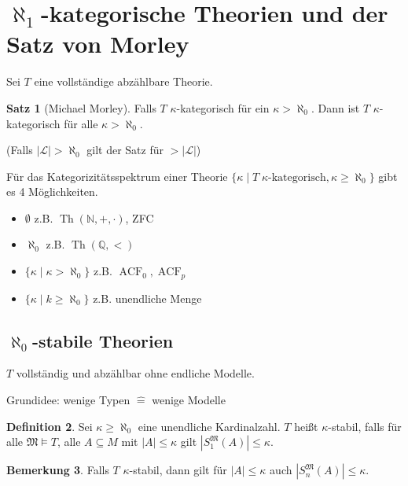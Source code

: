 \documentclass[12pt,parskip=full]{scrartcl}
\newcommand{\setN}{\mathbb{N}}
\newcommand{\setQ}{\mathbb{Q}}
\newcommand{\abs}[1]{{\left| #1 \right|}}
\theoremstyle{definition}
\newtheorem{theorem}{Satz}[section]
\newtheorem{definition}[theorem]{Definition}
\newtheorem{remark}[theorem]{Bemerkung}
\begin{document}
	\section{$\aleph_1$-kategorische Theorien und der Satz von Morley}
	
	Sei $T$ eine vollständige abzählbare Theorie.
	
	\begin{theorem}[Michael Morley]
		Falls $T$ $\kappa$-kategorisch für ein $\kappa > \aleph_0$. Dann ist $T$ $\kappa$-kategorisch für alle $\kappa > \aleph_0$.
		
		(Falls $\abs{\mathcal{L}} > \aleph_0$ gilt der Satz für $> \abs{\mathcal{L}}$)
		
		Für das Kategorizitätsspektrum einer Theorie $\{ \kappa \mid T \; \kappa\text{-kategorisch}, \kappa \geq \aleph_0 \}$ gibt es 4 Möglichkeiten.
		\begin{itemize}
			\item $\emptyset$ z.B. $\operatorname{Th}(\setN, +, \cdot)$, ZFC
			\item $\aleph_0$ z.B. $\operatorname{Th}(\setQ, <)$
			\item $\{ \kappa \mid \kappa > \aleph_0 \}$ z.B. $\operatorname{ACF}_0, \operatorname{ACF}_p$
			\item $\{ \kappa \mid k \geq \aleph_0 \}$ z.B. unendliche Menge
		\end{itemize}
	\end{theorem}
	
	\subsection{$\aleph_0$-stabile Theorien}
	
	$T$ vollständig und abzählbar ohne endliche Modelle.
	
	Grundidee: wenige Typen $\hat{=}$ wenige Modelle
	
	\begin{definition}
		Sei $\kappa \geq \aleph_0$ eine unendliche Kardinalzahl. $T$ heißt $\kappa$-stabil, falls für alle $\mathfrak{M} \models T$, alle $A \subseteq M$ mit $\abs{A} \leq \kappa$ gilt $\abs{S_1^\mathfrak{M}(A)} \leq \kappa$.
	\end{definition}

	\begin{remark}
		Falls $T$ $\kappa$-stabil, dann gilt für $\abs{A} \leq \kappa$ auch $\abs{S_n^\mathfrak{M}(A)} \leq \kappa$.
	\end{remark}
\end{document}
